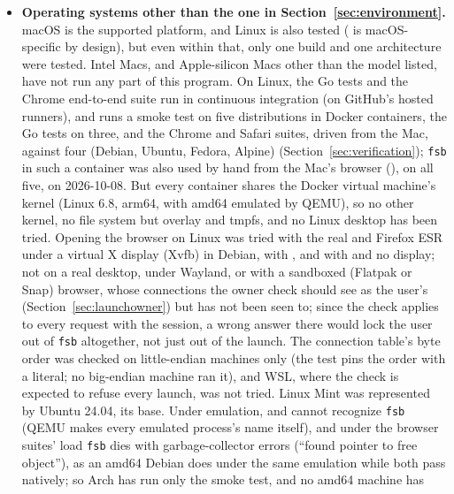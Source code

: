 \begin{itemize}
  \item \textbf{Operating systems other than the one in Section~\ref{sec:environment}.}
        macOS is the supported platform, and Linux is also tested ( is macOS-specific by design),
        but even within that, only one build and one architecture were tested.  Intel
        Macs, and Apple-silicon Macs other than the model listed, have not run any part
        of this program.  On Linux, the Go tests and the Chrome end-to-end suite run in
        continuous integration (on GitHub's hosted runners), and  runs a
        smoke test on five distributions in Docker containers, the Go tests on three, and
        the Chrome and Safari suites, driven from the Mac, against four (Debian, Ubuntu,
        Fedora, Alpine) (Section~\ref{sec:verification}); \texttt{fsb} in such a container
        was also used by hand from the Mac's browser (), on all
        five, on 2026-10-08.  But every container shares the Docker virtual machine's kernel
        (Linux 6.8, arm64, with amd64 emulated by QEMU), so no other kernel, no file
        system but overlay and tmpfs, and no Linux desktop has been tried.  Opening the
        browser on Linux was tried with the real  and Firefox ESR under a
        virtual X display (Xvfb) in Debian, with , and with
         and no display; not on a real desktop, under Wayland, or with a
        sandboxed (Flatpak or Snap) browser, whose connections the owner check should see
        as the user's (Section~\ref{sec:launchowner}) but has not been seen to; since the
        check applies to every request with the session, a wrong answer there would lock
        the user out of \texttt{fsb} altogether, not just out of the launch.  The connection table's byte order was checked on little-endian machines only
        (the test pins the order with a literal; no big-endian machine ran it), and WSL,
        where the check is expected to refuse every launch, was not tried.  Linux Mint was represented by Ubuntu 24.04, its base.  Under
        emulation,  and  cannot recognize \texttt{fsb}
        (QEMU makes every emulated process's  name itself), and under
        the browser suites' load \texttt{fsb} dies with garbage-collector errors (``found
        pointer to free object''), as an amd64 Debian does under the same emulation while
        both pass natively; so Arch has run only the smoke test, and no amd64 machine has

\end{itemize}
